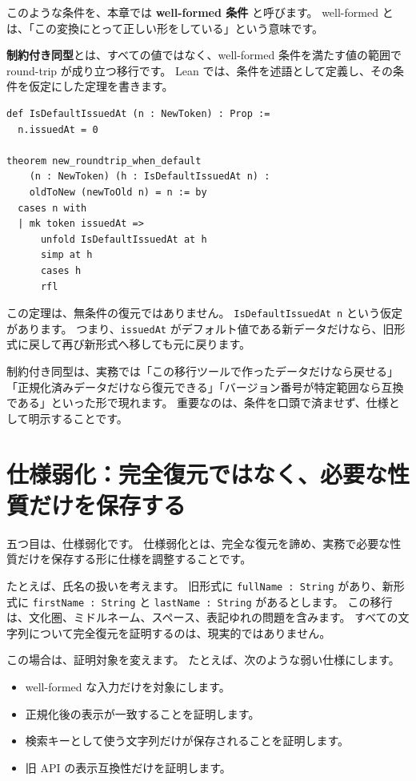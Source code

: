 このような条件を、本章では \textbf{well-formed 条件} と呼びます。
well-formed とは、「この変換にとって正しい形をしている」という意味です。

\textbf{制約付き同型}とは、すべての値ではなく、well-formed 条件を満たす値の範囲で round-trip が成り立つ移行です。
Lean では、条件を述語として定義し、その条件を仮定にした定理を書きます。

\begin{listing}[htbp]
\begin{verbatim}
def IsDefaultIssuedAt (n : NewToken) : Prop :=
  n.issuedAt = 0

theorem new_roundtrip_when_default
    (n : NewToken) (h : IsDefaultIssuedAt n) :
    oldToNew (newToOld n) = n := by
  cases n with
  | mk token issuedAt =>
      unfold IsDefaultIssuedAt at h
      simp at h
      cases h
      rfl
\end{verbatim}
\caption{\texttt{new\_roundtrip\_when\_default}}
\label{lst:ch27-conditional-roundtrip}
\end{listing}

この定理は、無条件の復元ではありません。
\texttt{IsDefaultIssuedAt n} という仮定があります。
つまり、\texttt{issuedAt} がデフォルト値である新データだけなら、旧形式に戻して再び新形式へ移しても元に戻ります。

制約付き同型は、実務では「この移行ツールで作ったデータだけなら戻せる」「正規化済みデータだけなら復元できる」「バージョン番号が特定範囲なら互換である」といった形で現れます。
重要なのは、条件を口頭で済ませず、仕様として明示することです。

\section{仕様弱化：完全復元ではなく、必要な性質だけを保存する}

五つ目は、仕様弱化です。
仕様弱化とは、完全な復元を諦め、実務で必要な性質だけを保存する形に仕様を調整することです。

たとえば、氏名の扱いを考えます。
旧形式に \texttt{fullName : String} があり、新形式に \texttt{firstName : String} と \texttt{lastName : String} があるとします。
この移行は、文化圏、ミドルネーム、スペース、表記ゆれの問題を含みます。
すべての文字列について完全復元を証明するのは、現実的ではありません。

この場合は、証明対象を変えます。
たとえば、次のような弱い仕様にします。

\begin{itemize}
\item well-formed な入力だけを対象にします。
\item 正規化後の表示が一致することを証明します。
\item 検索キーとして使う文字列だけが保存されることを証明します。
\item 旧 API の表示互換性だけを証明します。
\end{itemize}


